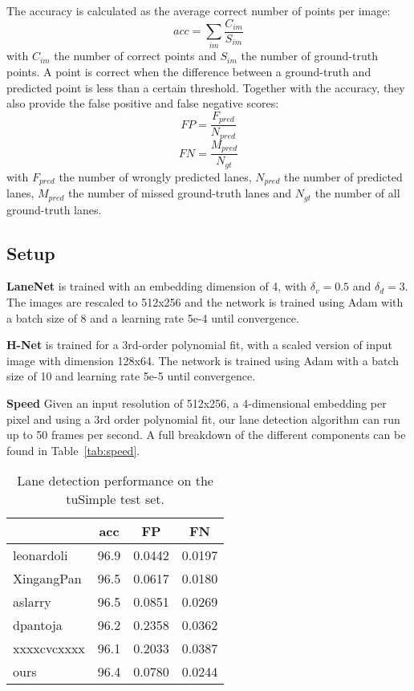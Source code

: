 \documentclass[letterpaper, 10 pt, conference]{ieeeconf}
\begin{document}
The accuracy is calculated as the average correct number of points per image: 
$$acc = \sum_{im} \frac{C_{im}}{S_{im}}$$
with $C_{im}$ the number of correct points and $S_ {im}$ the number of ground-truth points. A point is correct when the difference between a ground-truth and predicted point is less than a certain threshold. Together with the accuracy, they also provide the false positive and false negative scores:
$$ FP=\frac{F_{pred}}{N_{pred}} $$
$$ FN=\frac{M_{pred}}{N_{gt}} $$
with $F_{pred}$ the number of wrongly predicted lanes, $N_{pred}$ the number of predicted lanes, $M_{pred}$ the number of missed ground-truth lanes and $N_{gt}$ the number of all ground-truth lanes. 

\subsection{Setup}

\textbf{LaneNet} is trained with an embedding dimension of 4, with $\delta_v=0.5$ and $\delta_d=3$. The images are rescaled to 512x256 and the network is trained using Adam with a batch size of 8 and a learning rate 5e-4 until convergence. 

\textbf{H-Net} is trained for a 3rd-order polynomial fit, with a scaled version of input image with dimension 128x64. The network is trained using Adam with a batch size of 10 and learning rate 5e-5 until convergence. 

\textbf{Speed} Given an input resolution of 512x256, a 4-dimensional embedding per pixel and using a 3rd order polynomial fit, our lane detection algorithm can run up to 50 frames per second. A full breakdown of the different components can be found in Table~\ref{tab:speed}.


\begin{table}
	\begin{center}
    \begin{tabular}{l|c|c|c}
    	& acc & FP & FN \\
		\hline
        leonardoli & 96.9 & 0.0442 & 0.0197 \\
        XingangPan & 96.5 & 0.0617 & 0.0180 \\
        aslarry & 96.5 & 0.0851 & 0.0269 \\
        dpantoja & 96.2 & 0.2358 & 0.0362 \\
        xxxxcvcxxxx & 96.1 & 0.2033 & 0.0387 \\
        \hline
		ours & 96.4 & 0.0780 & 0.0244 \\
    \end{tabular}
    \end{center}
    \caption{Lane detection performance on the tuSimple test set.}
    \label{tab:results_tusimple}
\end{table}
\end{document}
